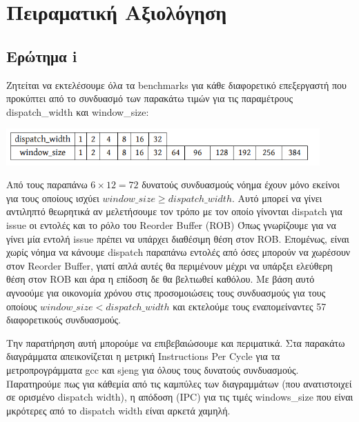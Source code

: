 \section{Πειραματική Αξιολόγηση}
\subsection{Ερώτημα i}
Ζητείται να εκτελέσουμε όλα τα benchmarks για κάθε διαφορετικό επεξεργαστή που
προκύπτει από το συνδυασμό των παρακάτω τιμών για τις παραμέτρους dispatch\_width
και window\_size:

\begin{center}
   \vspace{3mm}
   \includegraphics[width=0.9\textwidth]{./imgs/combos.png}
   \vspace{3mm}
\end{center}

\noindent Από τους παραπάνω $6 \times 12  = 72$ δυνατούς συνδυασμούς νόημα έχουν
μόνο εκείνοι για τους οποίους ισχύει $window\_size \geq dispatch\_width$. Αυτό
μπορεί να γίνει αντιληπτό θεωρητικά αν μελετήσουμε τον τρόπο με τον οποίο
γίνονται dispatch για issue οι εντολές και το ρόλο του Reorder Buffer (ROB) Όπως
γνωρίζουμε για να γίνει μία εντολή issue πρέπει να υπάρχει διαθέσιμη θέση στον
ROB. Επομένως, είναι χωρίς νόημα να κάνουμε dispatch παραπάνω εντολές από όσες
μπορούν να χωρέσουν στον Reorder Buffer, γιατί απλά αυτές θα περιμένουν μέχρι να
υπάρξει ελεύθερη θέση στον ROB και άρα η επίδοση δε θα βελτιωθεί καθόλου. Με
βάση αυτό αγνοούμε για οικονομία χρόνου στις προσομοιώσεις τους συνδυασμούς για
τους οποίους $window\_size < dispatch\_width$ και εκτελούμε τους εναπομείναντες
57 διαφορετικούς συνδυασμούς. 

Την παρατήρηση αυτή μπορούμε να επιβεβαιώσουμε και περιματικά. Στα παρακάτω
διαγράμματα απεικονίζεται η μετρική Instructions Per Cycle για τα
μετροπρογράμματα gcc και sjeng για όλους τους δυνατούς συνδυασμούς. Παρατηρούμε
πως για κάθεμία από τις καμπύλες των διαγραμμάτων (που ανατιστοιχεί σε ορισμένο
dispatch width), η απόδοση (IPC) για τις τιμές windows\_size που είναι μκρότερες από 
το dispatch width είναι αρκετά χαμηλή.

